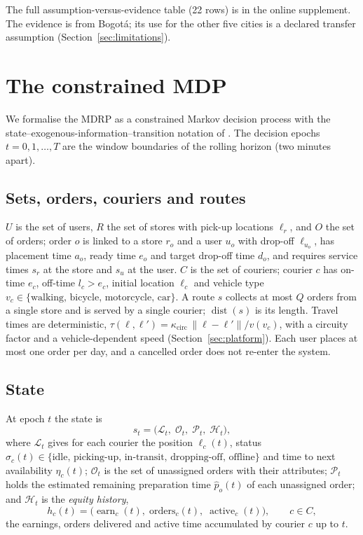\documentclass[preprint,12pt,authoryear]{elsarticle}%
\newcommand{\Hist}{\mathcal{H}}
\DeclareMathOperator{\dist}{dist}
\DeclareMathOperator{\earn}{earn}
\DeclareMathOperator{\act}{active}
\begin{document}
The full assumption-versus-evidence table (22 rows) is in the online supplement. The evidence is from Bogot\'a; its use for the other five cities is a declared transfer assumption (Section~\ref{sec:limitations}).

\section{The constrained MDP}
\label{sec:model}

We formalise the MDRP as a constrained Markov decision process \citep{altman1999constrained} with the state--exogenous-information--transition notation of \citet{powell2011approximate}. The decision epochs $t = 0, 1, \dots, T$ are the window boundaries of the rolling horizon (two minutes apart).

\subsection{Sets, orders, couriers and routes}

$U$ is the set of users, $R$ the set of stores with pick-up locations $\ell_r$, and $O$ the set of orders; order $o$ is linked to a store $r_o$ and a user $u_o$ with drop-off $\ell_{u_o}$, has placement time $a_o$, ready time $e_o$ and target drop-off time $d_o$, and requires service times $s_r$ at the store and $s_u$ at the user. $C$ is the set of couriers; courier $c$ has on-time $e_c$, off-time $l_c > e_c$, initial location $\ell_c$ and vehicle type $v_c \in \{\text{walking, bicycle, motorcycle, car}\}$. A route $s$ collects at most $Q$ orders from a single store and is served by a single courier; $\dist(s)$ is its length. Travel times are deterministic, $\tau(\ell,\ell') = \kappa_{\text{circ}}\, \|\ell - \ell'\| / v(v_c)$, with a circuity factor and a vehicle-dependent speed (Section~\ref{sec:platform}). Each user places at most one order per day, and a cancelled order does not re-enter the system.

\subsection{State}

At epoch $t$ the state is
\begin{equation}
s_t = \bigl(\mathcal{L}_t,\; \mathcal{O}_t,\; \mathcal{P}_t,\; \Hist_t\bigr),
\label{eq:state}
\end{equation}
where $\mathcal{L}_t$ gives for each courier the position $\ell_c(t)$, status $\sigma_c(t) \in \{\text{idle, picking-up, in-transit, dropping-off, offline}\}$ and time to next availability $\eta_c(t)$; $\mathcal{O}_t$ is the set of unassigned orders with their attributes; $\mathcal{P}_t$ holds the estimated remaining preparation time $\hat p_o(t)$ of each unassigned order; and $\Hist_t$ is the \emph{equity history},
\begin{equation}
h_c(t) = \bigl(\earn_c(t),\; \text{orders}_c(t),\; \act_c(t)\bigr), \qquad c \in C,
\label{eq:history}
\end{equation}
the earnings, orders delivered and active time accumulated by courier $c$ up to $t$.
\end{document}
